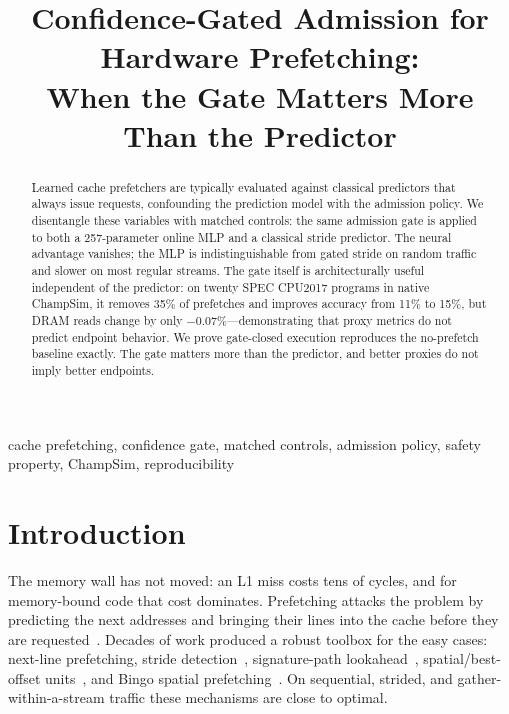\documentclass[conference]{IEEEtran}
\begin{document}
\title{Confidence-Gated Admission for Hardware Prefetching:\\When the Gate Matters More Than the Predictor}

\author{
\and
{}
\and
{}
}

\maketitle

\begin{abstract}
Learned cache prefetchers are typically evaluated against classical
predictors that always issue requests, confounding the prediction model
with the admission policy. We disentangle these variables with matched
controls: the same admission gate is applied to both a 257-parameter
online MLP and a classical stride predictor. The neural advantage
vanishes; the MLP is indistinguishable from gated stride on random
traffic and slower on most regular streams. The gate itself is
architecturally useful independent of the predictor: on twenty SPEC
CPU2017 programs in native ChampSim, it removes 35\% of prefetches and
improves accuracy from 11\% to 15\%, but DRAM reads change by only
$-0.07\%$---demonstrating that proxy metrics do not predict endpoint
behavior. We prove gate-closed execution reproduces the no-prefetch
baseline exactly. The gate matters more than the predictor,
and better proxies do not imply better endpoints.
\end{abstract}

\begin{IEEEkeywords}
cache prefetching, confidence gate, matched controls, admission policy,
safety property, ChampSim, reproducibility
\end{IEEEkeywords}

\section{Introduction}
\label{sec:intro}

The memory wall has not moved: an L1 miss costs tens of cycles, and for
memory-bound code that cost dominates. Prefetching attacks the problem by
predicting the next addresses and bringing their lines into the cache before
they are requested~\cite{wulf1995,chen1995}. Decades of work produced a
robust toolbox for the easy cases: next-line prefetching, stride
detection~\cite{chen1995}, signature-path lookahead~\cite{kim2016spp},
spatial/best-offset units~\cite{michaud2016bop}, and Bingo spatial
prefetching~\cite{bingo}. On sequential, strided, and
gather-within-a-stream traffic these mechanisms are close to optimal.
\end{document}
